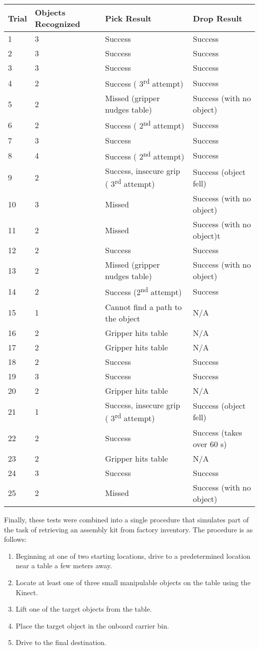 \documentclass[]{cwru} %
\begin{document}
\begin{table}
\caption{Results of object recognition and manipulation tests}
\label{tab:object-recognition}

\begin{longtable}[c]{lp{2.5cm}ll}
\toprule
\textbf{Trial} & \textbf{Objects Recognized} & \textbf{Pick Result} &
\textbf{Drop Result}\tabularnewline
\midrule
\endhead
1 & 3 & Success & Success\tabularnewline
2 & 3 & Success & Success\tabularnewline
3 & 3 & Success & Success\tabularnewline
4 & 2 & Success ( 3\textsuperscript{rd} attempt) &
Success\tabularnewline
5 & 2 & Missed (gripper nudges table) & Success (with no
object)\tabularnewline
6 & 2 & Success ( 2\textsuperscript{nd} attempt) &
Success\tabularnewline
7 & 3 & Success & Success\tabularnewline
8 & 4 & Success ( 2\textsuperscript{nd} attempt) &
Success\tabularnewline
9 & 2 & Success, insecure grip ( 3\textsuperscript{rd} attempt) &
Success (object fell)\tabularnewline
10 & 3 & Missed & Success (with no object)\tabularnewline
11 & 2 & Missed & Success (with no object)t\tabularnewline
12 & 2 & Success & Success\tabularnewline
13 & 2 & Missed (gripper nudges table) & Success (with no
object)\tabularnewline
14 & 2 & Success (2\textsuperscript{nd} attempt) &
Success\tabularnewline
15 & 1 & Cannot find a path to the object & N/A\tabularnewline
16 & 2 & Gripper hits table & N/A\tabularnewline
17 & 2 & Gripper hits table & N/A\tabularnewline
18 & 2 & Success & Success\tabularnewline
19 & 3 & Success & Success\tabularnewline
20 & 2 & Gripper hits table & N/A\tabularnewline
21 & 1 & Success, insecure grip ( 3\textsuperscript{rd} attempt) &
Success (object fell)\tabularnewline
22 & 2 & Success & Success (takes over 60 s)\tabularnewline
23 & 2 & Gripper hits table & N/A\tabularnewline
24 & 3 & Success & Success\tabularnewline
25 & 2 & Missed & Success (with no object)\tabularnewline
\bottomrule
\end{longtable}
\end{table}
Finally, these tests were combined into a single procedure that
simulates part of the task of retrieving an assembly kit from factory
inventory. The procedure is as follows:

\begin{enumerate}
\def\labelenumi{\arabic{enumi}.}
\item
  Beginning at one of two starting locations, drive to a predetermined
  location near a table a few meters away.
\item
  Locate at least one of three small manipulable objects on the table
  using the Kinect.
\item
  Lift one of the target objects from the table.
\item
  Place the target object in the onboard carrier bin.
\item
  Drive to the final destination.
\end{enumerate}
\end{document}
